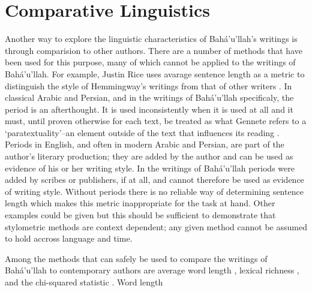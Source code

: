 \documentclass[12pt, oneside]{report}
\begin{document}
\section{Comparative Linguistics}
\par
Another way to explore the linguistic characteristics of Bah\'{a}'u'llah's writings is through comparision to other authors. There are a number of methods that have been used for this purpose, many of which cannot be applied to the writings of Bah\'{a}'u'llah. For example, Justin Rice uses avarage sentence length as a metric to distinguish the style of Hemmingway's writings from that of other writers \cite{justin_rice_what_2018}. In classical Arabic and Persian, and in the writings of Bah\'{a}'u'llah specificaly, the period is an afterthought. It is used inconsistently when it is used at all and it must, until proven otherwise for each text, be treated as what Gennete refers to a `paratextuality'–an element outside of the text that influences its reading \cite{genette_gerard_palimpsests:_1997}. Periods in English, and often in modern Arabic and Persian, are part of the author's literary production; they are added by the author and can be used as evidence of his or her writing style. In the writings of Bah\'{a}'u'llah periods were added by scribes or publishers, if at all, and cannot therefore be used as evidence of writing style. Without periods there is no reliable way of determining sentence length which makes this metric inappropriate for the task at hand. Other examples could be given but this should be sufficient to demonstrate that stylometric methods are context dependent; any given method cannot be assumed to hold accross language and time.
\par
Among the methods that can safely be used to compare the writings of Bah\'{a}'u'llah to contemporary authors are average word length \cite{justin_rice_what_2018}, lexical richness \cite{justin_rice_what_2018}, and the chi-squared statistic  \cite{kilgarriff_comparing_2001} \cite{laramee_introduction_2018}. Word length
\end{document}
